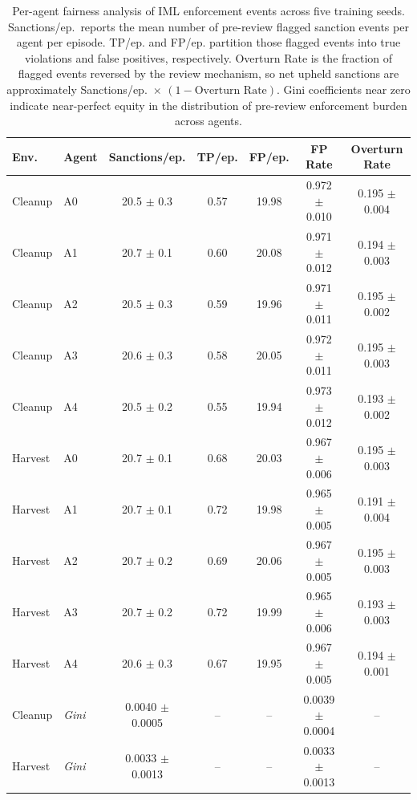 \begin{table}[htbp]
\centering
\caption{Per-agent fairness analysis of IML enforcement events across five training seeds. Sanctions/ep.\ reports the mean number of pre-review flagged sanction events per agent per episode. TP/ep. and FP/ep. partition those flagged events into true violations and false positives, respectively. Overturn Rate is the fraction of flagged events reversed by the review mechanism, so net upheld sanctions are approximately Sanctions/ep.\ $\times$ $(1-\text{Overturn Rate})$. Gini coefficients near zero indicate near-perfect equity in the distribution of pre-review enforcement burden across agents.}
\label{tab:fairness}
\begin{tabular}{llccccc}
\toprule
\textbf{Env.} & \textbf{Agent} & \textbf{Sanctions/ep.} & \textbf{TP/ep.} & \textbf{FP/ep.} & \textbf{FP Rate} & \textbf{Overturn Rate} \\
\midrule
Cleanup & A0 & 20.5 $\pm$ 0.3 & 0.57 & 19.98 & 0.972 $\pm$ 0.010 & 0.195 $\pm$ 0.004 \\
Cleanup & A1 & 20.7 $\pm$ 0.1 & 0.60 & 20.08 & 0.971 $\pm$ 0.012 & 0.194 $\pm$ 0.003 \\
Cleanup & A2 & 20.5 $\pm$ 0.3 & 0.59 & 19.96 & 0.971 $\pm$ 0.011 & 0.195 $\pm$ 0.002 \\
Cleanup & A3 & 20.6 $\pm$ 0.3 & 0.58 & 20.05 & 0.972 $\pm$ 0.011 & 0.195 $\pm$ 0.003 \\
Cleanup & A4 & 20.5 $\pm$ 0.2 & 0.55 & 19.94 & 0.973 $\pm$ 0.012 & 0.193 $\pm$ 0.002 \\
\midrule
Harvest & A0 & 20.7 $\pm$ 0.1 & 0.68 & 20.03 & 0.967 $\pm$ 0.006 & 0.195 $\pm$ 0.003 \\
Harvest & A1 & 20.7 $\pm$ 0.1 & 0.72 & 19.98 & 0.965 $\pm$ 0.005 & 0.191 $\pm$ 0.004 \\
Harvest & A2 & 20.7 $\pm$ 0.2 & 0.69 & 20.06 & 0.967 $\pm$ 0.005 & 0.195 $\pm$ 0.003 \\
Harvest & A3 & 20.7 $\pm$ 0.2 & 0.72 & 19.99 & 0.965 $\pm$ 0.006 & 0.193 $\pm$ 0.003 \\
Harvest & A4 & 20.6 $\pm$ 0.3 & 0.67 & 19.95 & 0.967 $\pm$ 0.005 & 0.194 $\pm$ 0.001 \\
\midrule
Cleanup & \textit{Gini} & 0.0040 $\pm$ 0.0005 & -- & -- & 0.0039 $\pm$ 0.0004 & -- \\
\midrule
Harvest & \textit{Gini} & 0.0033 $\pm$ 0.0013 & -- & -- & 0.0033 $\pm$ 0.0013 & -- \\
\bottomrule
\end{tabular}
\end{table}
